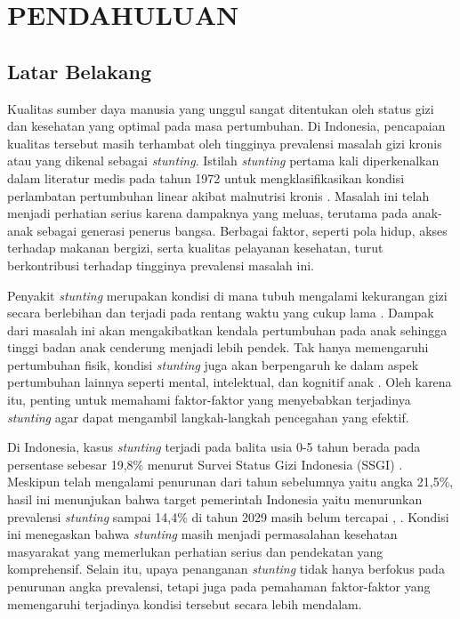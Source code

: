 \newpage
\chapter{PENDAHULUAN} \label{Bab I}

\section{Latar Belakang} \label{I.Latar Belakang}
Kualitas sumber daya manusia yang unggul sangat ditentukan oleh status gizi dan kesehatan yang optimal pada masa pertumbuhan. Di Indonesia, pencapaian kualitas tersebut masih terhambat oleh tingginya prevalensi masalah gizi kronis atau yang dikenal sebagai \textit{stunting}. Istilah \textit{stunting} pertama kali diperkenalkan dalam literatur medis pada tahun 1972 untuk mengklasifikasikan kondisi perlambatan pertumbuhan linear akibat malnutrisi kronis \cite{waterlow1972classification}. Masalah ini telah menjadi perhatian serius karena dampaknya yang meluas, terutama pada anak-anak sebagai generasi penerus bangsa. Berbagai faktor, seperti pola hidup, akses terhadap makanan bergizi, serta kualitas pelayanan kesehatan, turut berkontribusi terhadap tingginya prevalensi masalah ini.

Penyakit \textit{stunting} merupakan kondisi di mana tubuh mengalami kekurangan gizi secara berlebihan dan terjadi pada rentang waktu yang cukup lama \cite{said2024pencegahan}. Dampak dari masalah ini akan mengakibatkan kendala pertumbuhan pada anak sehingga tinggi badan anak cenderung menjadi lebih pendek. Tak hanya memengaruhi pertumbuhan fisik, kondisi \textit{stunting} juga akan berpengaruh ke dalam aspek pertumbuhan lainnya seperti mental, intelektual, dan kognitif anak \cite{rahagia2023upaya}. Oleh karena itu, penting untuk memahami faktor-faktor yang menyebabkan terjadinya \textit{stunting} agar dapat mengambil langkah-langkah pencegahan yang efektif.

Di Indonesia, kasus \textit{stunting} terjadi pada balita usia 0-5 tahun berada pada persentase sebesar 19,8\% menurut Survei Status Gizi Indonesia (SSGI) \cite{kemenkes2025ssgi}. Meskipun telah mengalami penurunan dari tahun sebelumnya yaitu angka 21,5\%, hasil ini menunjukan bahwa target pemerintah Indonesia yaitu menurunkan prevalensi \textit{stunting} sampai 14,4\% di tahun 2029 masih belum tercapai \cite{bkpk2023ski}, \cite{setneg2024strategi}. Kondisi ini menegaskan bahwa \textit{stunting} masih menjadi permasalahan kesehatan masyarakat yang memerlukan perhatian serius dan pendekatan yang komprehensif. Selain itu, upaya penanganan \textit{stunting} tidak hanya berfokus pada penurunan angka prevalensi, tetapi juga pada pemahaman faktor-faktor yang memengaruhi terjadinya kondisi tersebut secara lebih mendalam.

